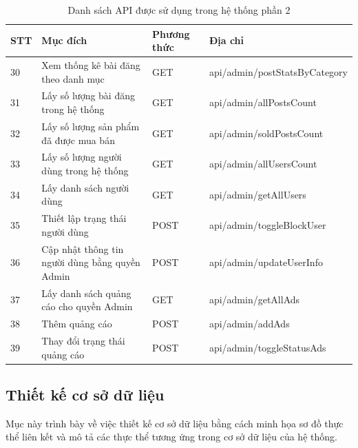 \documentclass[../DoAn.tex]{subfiles}
\begin{document}
\newpage
\begin{table}[H]
\begin{tabular}{|p{1cm}|p{5.5cm}|p{1.5cm}|p{6.5cm}|}
\hline
STT & Mục đích                                       & Phương thức & Địa chỉ                       \\ \hline
30  & Xem thống kê bài đăng theo danh mục            & GET         & api/admin/postStatsByCategory \\ \hline
31  & Lấy số lượng bài đăng trong hệ thống           & GET         & api/admin/allPostsCount       \\ \hline
32  & Lấy số lượng sản phẩm đã được mua bán          & GET         & api/admin/soldPostsCount      \\ \hline
33  & Lấy số lượng người dùng trong hệ thống         & GET         & api/admin/allUsersCount       \\ \hline
34  & Lấy danh sách người dùng                       & GET         & api/admin/getAllUsers         \\ \hline
35  & Thiết lập trạng thái người dùng                & POST        & api/admin/toggleBlockUser     \\ \hline
36  & Cập nhật thông tin người dùng bằng quyền Admin & POST        & api/admin/updateUserInfo      \\ \hline
37  & Lấy danh sách quảng cáo cho quyền Admin        & GET         & api/admin/getAllAds           \\ \hline
38  & Thêm quảng cáo                                 & POST        & api/admin/addAds              \\ \hline
39  & Thay đổi trạng thái quảng cáo                  & POST        & api/admin/toggleStatusAds     \\ \hline
\end{tabular}
\caption{Danh sách API được sử dụng trong hệ thống phần 2}
\label{tab:my-table}
\end{table}
\newpage
\subsection{Thiết kế cơ sở dữ liệu}
Mục này trình bày về việc thiết kế cơ sở dữ liệu bằng cách minh họa sơ đồ thực thể liên kết và mô tả các thực thể tương ứng trong cơ sở dữ liệu của hệ thống.
\end{document}
